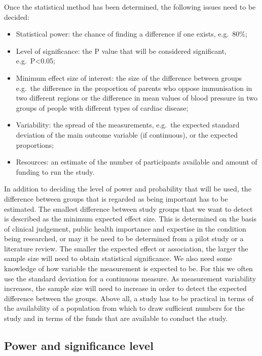 \documentclass[
]{memoir}
\providecommand{\tightlist}{%
  \setlength{\itemsep}{0pt}\setlength{\parskip}{0pt}}
\begin{document}
Once the statistical method has been determined, the following issues need to be decided:

\begin{itemize}
\tightlist
\item
  Statistical power: the chance of finding a difference if one exists, e.g.~80\%;
\item
  Level of significance: the P value that will be considered significant, e.g.~P\textless0.05;
\item
  Minimum effect size of interest: the size of the difference between groups e.g.~the difference in the proportion of parents who oppose immunisation in two different regions or the difference in mean values of blood pressure in two groups of people with different types of cardiac disease;
\item
  Variability: the spread of the measurements, e.g.~the expected standard deviation of the main outcome variable (if continuous), or the expected proportions;
\item
  Resources: an estimate of the number of participants available and amount of funding to run the study.
\end{itemize}

In addition to deciding the level of power and probability that will be used, the difference between groups that is regarded as being important has to be estimated. The smallest difference between study groups that we want to detect is described as the minimum expected effect size. This is determined on the basis of clinical judgement, public health importance and expertise in the condition being researched, or may it be need to be determined from a pilot study or a literature review. The smaller the expected effect or association, the larger the sample size will need to obtain statistical significance.
We also need some knowledge of how variable the measurement is expected to be. For this we often use the standard deviation for a continuous measure. As measurement variability increases, the sample size will need to increase in order to detect the expected difference between the groups.
Above all, a study has to be practical in terms of the availability of a population from which to draw sufficient numbers for the study and in terms of the funds that are available to conduct the study.

\hypertarget{power-and-significance-level}{%
\subsection{Power and significance level}\label{power-and-significance-level}}
\end{document}
